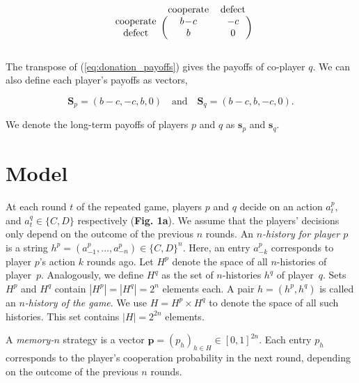 \documentclass{article}
\theoremstyle{definition}
\begin{document}
\begin{equation}\label{eq:donation_payoffs}
  \begin{blockarray}{ccc}
      & \text{cooperate} & \text{defect} \\
      \begin{block}{c(cc)}
          \text{cooperate} & b\!-\!c & -c \\
          \text{defect} & b & 0 \\
      \end{block}
  \end{blockarray}
\end{equation}

The transpose of (\ref{eq:donation_payoffs}) gives the payoffs of co-player
\(q\). We can also define each player's payoffs as vectors,

\begin{equation}\label{eq:vector_payoffs}
  \mathbf{S}_{p} = (b\!-\!c, -c, b, 0) \quad \textrm{and} \quad  \mathbf{S}_{q} = (b\!-\!c, b, -c, 0).
\end{equation}

We denote the long-term payoffs of players \(p\) and \(q\) as \(\mathbf{s}_{p}\)
and \(\mathbf{s}_{q}\).

\section{Model}

At each round \(t\) of the repeated game, players \(p\) and \(q\) decide on an
action \(a^{p}_{t},\) and \(a^{q}_{t} \in \{C, D\}\) respectively (\textbf{Fig.
1a}). We assume that the players' decisions only depend on the outcome of the
previous \(n\) rounds. An {\it $n$-history for player $p$} is a string
$h^p=(a^p_{-1},\ldots,a^p_{-n})\!\in\!\{C,D\}^n$. Here, an entry $a^p_{-k}$
corresponds to player $p$'s action $k$ rounds ago. Let $H^p$ denote the space of
all $n$-histories of player~$p$. Analogously, we define $H^q$ as the set of
$n$-histories $h^q$ of player~$q$. Sets $H^p$ and $H^q$ contain
$|H^p|=|H^q|=2^{n}$ elements each. A pair $h\!=\!(h^p,h^q)$ is called an {\it
$n$-history of the game}. We use $H=H^p\times H^q$ to denote the space of all
such histories. This set contains $|H|=2^{2n}$ elements.

A {\it memory-$n$} strategy is a vector $\mathbf{p}=(p_h)_{h\in
H}\in[0,1]^{2n}$. Each entry $p_h$ corresponds to the player's cooperation
probability in the next round, depending on the outcome of the previous $n$
rounds.
\end{document}
